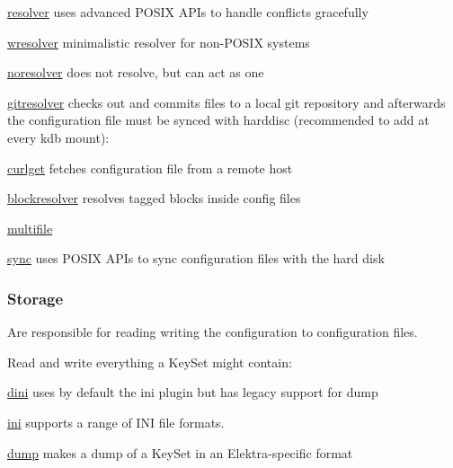 \begin{DoxyItemize}
\item \hyperlink{md_src_plugins_resolver_README_src_plugins_resolver_README_md}{resolver} uses advanced P\+O\+S\+IX A\+P\+Is to handle conflicts gracefully
\item \hyperlink{md_src_plugins_wresolver_README_src_plugins_wresolver_README_md}{wresolver} minimalistic resolver for non-\/\+P\+O\+S\+IX systems
\item \hyperlink{md_src_plugins_noresolver_README_src_plugins_noresolver_README_md}{noresolver} does not resolve, but can act as one
\item \hyperlink{md_src_plugins_gitresolver_README_src_plugins_gitresolver_README_md}{gitresolver} checks out and commits files to a local git repository and afterwards the configuration file must be synced with harddisc (recommended to add at every kdb mount)\+:
\item \hyperlink{md_src_plugins_curlget_README_src_plugins_curlget_README_md}{curlget} fetches configuration file from a remote host
\item \hyperlink{md_src_plugins_blockresolver_README_src_plugins_blockresolver_README_md}{blockresolver} resolves tagged blocks inside config files
\item \hyperlink{md_src_plugins_multifile_README_src_plugins_multifile_README_md}{multifile}
\item \hyperlink{md_src_plugins_sync_README_src_plugins_sync_README_md}{sync} uses P\+O\+S\+IX A\+P\+Is to sync configuration files with the hard disk
\end{DoxyItemize}

\subsubsection*{Storage}

Are responsible for reading writing the configuration to configuration files.

Read and write everything a Key\+Set might contain\+:


\begin{DoxyItemize}
\item \hyperlink{md_src_plugins_dini_README_src_plugins_dini_README_md}{dini} uses by default the ini plugin but has legacy support for dump
\item \hyperlink{md_src_plugins_ini_README_src_plugins_ini_README_md}{ini} supports a range of I\+NI file formats.
\item \hyperlink{md_src_plugins_dump_README_src_plugins_dump_README_md}{dump} makes a dump of a Key\+Set in an Elektra-\/specific format
\end{DoxyItemize}

